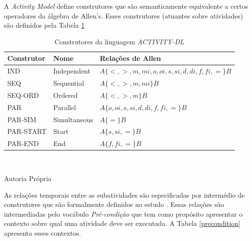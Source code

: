 A \textit{Activity Model} define construtores que são semanticamente equivalente a certos operadores da álgebra de Allen's. Esses construtores (atuantes sobre atividades) são definidos pela Tabela \ref{acticonstruct}

\begin{table}[H]
\centering
\caption{Construtores da linguagem \textit{ACTIVITY-DL} \cite{v3sframework}}
\begin{tabular}{|l|l|l|}
\hline
Construtor & Nome         & Relações de Allen \\ \hline
IND        & Independent  & $A \{ <,>,m,mi,o,oi,s,si,d,di,f,fi,= \} B$\\ \hline
SEQ        & Sequential   & $A \{ <,>,m,mi \} B$\\ \hline
SEQ-ORD    & Ordered      & $A \{ <,>,m \} B$\\ \hline
PAR        & Parallel     & $A \{ o,oi,s,si,d,di,f,fi,= \} B$ \\ \hline
PAR-SIM    & Simultaneous & $A \{ = \} B$\\ \hline
PAR-START  & Start        & $A \{ s,si,= \} B$\\ \hline
PAR-END    & End          & $A \{ f,fi,= \} B$ \\ \hline
\end{tabular}
\label{acticonstruct}
\\
\begin{center}
Autoria Própria
\end{center}
\end{table}

As relações temporais entre as subatividades são especificadas por intermédio de construtores que são formalmente definidos no estudo \cite{allenalgebric}. Essas relações são intermediadas pelo vocábulo \textit{Pré-condição} que tem como propósito apresentar o contexto sobre qual uma atividade deve ser executada. A Tabela \ref{precondition} apresenta esses contextos.

